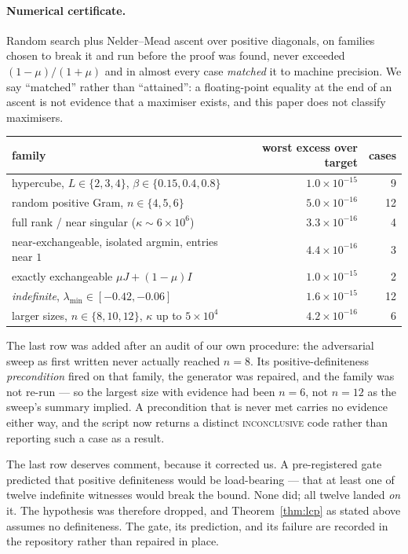 \documentclass[11pt,a4paper]{article}
\theoremstyle{plain}
\theoremstyle{definition}
\begin{document}
\paragraph{Numerical certificate.} Random search plus Nelder--Mead ascent over
positive diagonals, on families chosen to break it and run before the proof was
found, never exceeded $(1-\mu)/(1+\mu)$ and in almost every case \emph{matched}
it to machine precision. We say ``matched'' rather than ``attained'': a
floating-point equality at the end of an ascent is not evidence that a maximiser
exists, and this paper does not classify maximisers.

\begin{center}
\begin{tabular}{lrr}
\toprule
family & worst excess over target & cases \\
\midrule
hypercube, $L\in\{2,3,4\}$, $\beta\in\{0.15,0.4,0.8\}$ & $1.0\times10^{-15}$ & 9\\
random positive Gram, $n\in\{4,5,6\}$                  & $5.0\times10^{-16}$ & 12\\
full rank / near singular ($\kappa\sim6\times10^{6}$)  & $3.3\times10^{-16}$ & 4\\
near-exchangeable, isolated argmin, entries near $1$   & $4.4\times10^{-16}$ & 3\\
exactly exchangeable $\mu J+(1-\mu)I$                  & $1.0\times10^{-15}$ & 2\\
\emph{indefinite}, $\lambda_{\min}\in[-0.42,-0.06]$    & $1.6\times10^{-15}$ & 12\\
larger sizes, $n\in\{8,10,12\}$, $\kappa$ up to $5\times10^{4}$
                                                       & $4.2\times10^{-16}$ & 6\\
\bottomrule
\end{tabular}
\end{center}

The last row was added after an audit of our own procedure: the adversarial
sweep as first written never actually reached $n=8$. Its positive-definiteness
\emph{precondition} fired on that family, the generator was repaired, and the
family was not re-run --- so the largest size with evidence had been $n=6$, not
$n=12$ as the sweep's summary implied. A precondition that is never met carries
no evidence either way, and the script now returns a distinct
\textsc{inconclusive} code rather than reporting such a case as a result.

The last row deserves comment, because it corrected us. A pre-registered gate
predicted that positive definiteness would be load-bearing --- that at least one
of twelve indefinite witnesses would break the bound. None did; all twelve
landed \emph{on} it. The hypothesis was therefore dropped, and
Theorem~\ref{thm:lcp} as stated above assumes no definiteness. The gate, its
prediction, and its failure are recorded in the repository rather than repaired
in place.
\end{document}
